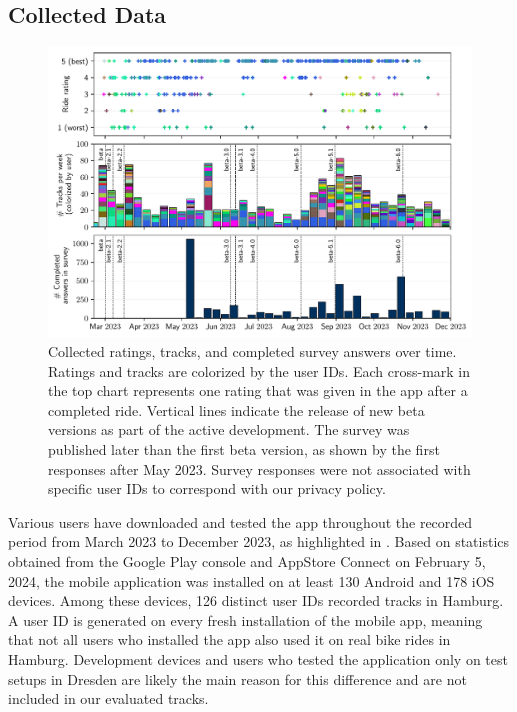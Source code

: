 \subsection{Collected Data}

\begin{figure}[!b]
\caption{Collected ratings, tracks, and completed survey answers over time. Ratings and tracks are colorized by the user IDs. Each cross-mark in the top chart represents one rating that was given in the app after a completed ride. Vertical lines indicate the release of new beta versions as part of the active development. The survey was published later than the first beta version, as shown by the first responses after May 2023. Survey responses were not associated with specific user IDs to correspond with our privacy policy.}\label{fig:app-usage-over-time}
\includegraphics[width=\linewidth]{images/app-usage-over-time.pdf}
\end{figure}

Various users have downloaded and tested the app throughout the recorded period from March 2023 to December 2023, as highlighted in . Based on statistics obtained from the Google Play console and AppStore Connect on February 5, 2024, the mobile application was installed on at least 130 Android and 178 iOS devices. Among these devices, 126 distinct user IDs recorded tracks in Hamburg. A user ID is generated on every fresh installation of the mobile app, meaning that not all users who installed the app also used it on real bike rides in Hamburg. Development devices and users who tested the application only on test setups in Dresden are likely the main reason for this difference and are not included in our evaluated tracks.

